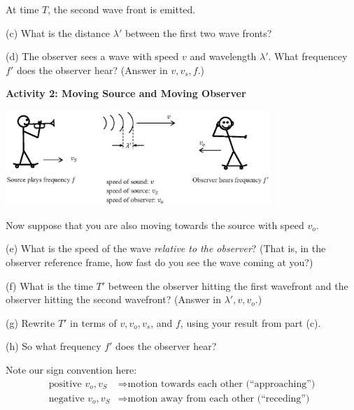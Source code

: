 At time $T$, the second wave front is emitted.

(c) What is the distance $\lambda'$ between the first two wave fronts?
\vspace{1.0in}

(d) The observer sees a wave with speed $v$ and wavelength $\lambda'$.  What frequencey $f'$ does the observer hear? (Answer in $v, v_s, f$.)
\vspace{1.0in}

\pagebreak
\textbf{Activity 2: Moving Source and Moving Observer}

\begin{center}
\includegraphics[width=0.75\textwidth]{doppler_shift/moving_observer.eps}
\end{center}

Now suppose that you are also moving towards the source with speed $v_o$.  

(e) What is the speed of the wave \textit{relative to the observer}?  (That is, in the observer reference frame, how fast do you see the wave coming at you?) 
\vspace{1.0in}

(f) What is the time $T'$ between the observer hitting the first wavefront and the observer hitting the second wavefront? (Answer in $\lambda', v, v_o$.)
\vspace{1.0in}

(g) Rewrite $T'$ in terms of $v, v_o, v_s$, and $f$, using your result from part (c).
\vspace{1.0in}

(h) So what frequency $f'$ does the observer hear?

\vfill

Note our sign convention here:
\begin{align*}
\textrm{positive } v_o, v_S &\Longrightarrow \textrm{motion towards each other (``approaching'')} \\
\textrm{negative } v_o, v_S &\Longrightarrow \textrm{motion away from each other (``receding'')} 
\end{align*}

